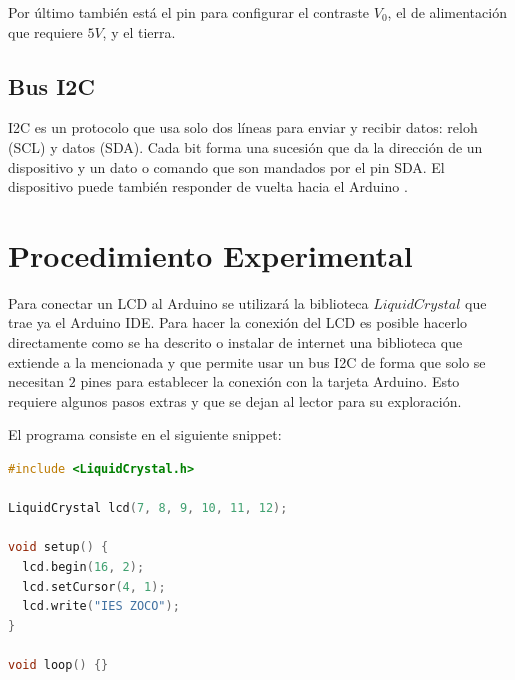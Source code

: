 \documentclass{article}
\begin{document}
    Por último también está el pin para configurar el contraste $V_0$, el de
    alimentación que requiere $5V$, y el tierra.

    \subsection{Bus I2C}

    I2C es un protocolo que usa solo dos líneas para enviar y recibir datos:
    reloh (SCL) y datos (SDA). Cada bit forma una sucesión que da la
    dirección de un dispositivo y un dato o comando que son mandados por el
    pin SDA. El dispositivo puede también responder de vuelta hacia el
    Arduino \cite{arduino-docs-i2c-2021}.

    \section{Procedimiento Experimental}

    Para conectar un LCD al Arduino se utilizará la biblioteca
    $LiquidCrystal$ que trae ya el Arduino IDE. Para hacer la conexión del
    LCD es posible hacerlo directamente como se ha descrito o instalar de
    internet una biblioteca que extiende a la mencionada y que permite usar
    un bus I2C de forma que solo se necesitan $2$ pines para establecer la
    conexión con la tarjeta Arduino. Esto requiere algunos pasos extras y que
    se dejan al lector para su exploración.

    \bigbreak

    El programa consiste en el siguiente snippet:

    \begin{lstlisting}[language=C, caption=Arduino Sketch]
#include <LiquidCrystal.h>

LiquidCrystal lcd(7, 8, 9, 10, 11, 12);

void setup() {
  lcd.begin(16, 2);
  lcd.setCursor(4, 1);
  lcd.write("IES ZOCO");
}

void loop() {}
    \end{lstlisting}
\end{document}

